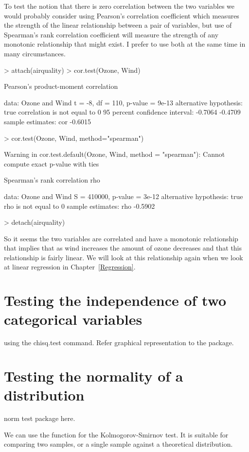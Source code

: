 To test the notion that there is zero correlation between the two variables we would probably consider using Pearson's correlation coefficient which measures the strength of the linear relationship between a pair of variables, but use of Spearman's rank correlation coefficient will measure the strength of any monotonic relationship that might exist. I prefer to use both at the same time in many circumstances.
\begin{Schunk}
\begin{Sinput}
> attach(airquality)
> cor.test(Ozone, Wind)
\end{Sinput}
\begin{Soutput}

	Pearson's product-moment correlation

data:  Ozone and Wind
t = -8, df = 110, p-value = 9e-13
alternative hypothesis: true correlation is not equal to 0
95 percent confidence interval:
 -0.7064 -0.4709
sample estimates:
    cor 
-0.6015 
\end{Soutput}
\begin{Sinput}
> cor.test(Ozone, Wind, method="spearman")
\end{Sinput}
\begin{Soutput}
Warning in cor.test.default(Ozone, Wind, method = "spearman"): Cannot compute exact p-value with ties
\end{Soutput}
\begin{Soutput}

	Spearman's rank correlation rho

data:  Ozone and Wind
S = 410000, p-value = 3e-12
alternative hypothesis: true rho is not equal to 0
sample estimates:
    rho 
-0.5902 
\end{Soutput}
\begin{Sinput}
> detach(airquality)
\end{Sinput}
\end{Schunk}
So it seems the two variables are correlated and have a monotonic relationship that implies that as wind increases the amount of ozone decreases and that this relationship is fairly linear. We will look at this relationship again when we look at linear regression in Chapter~\ref{Regression}.





\section{Testing the independence of two categorical variables}
using the chisq.test command.
Refer graphical representation to the  package.

\section{Testing the normality of a distribution}

norm test package here.

We can use the  function for the Kolmogorov-Smirnov test. It is suitable for comparing two samples, or a single sample against a theoretical distribution.


